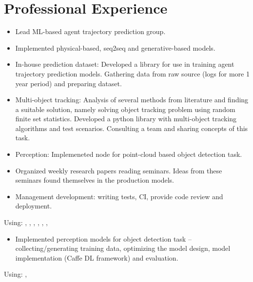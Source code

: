 \section*{\sectionformat Professional Experience}
% 
\begin{itemize}
    \item Lead ML-based agent trajectory prediction group.
    \item Implemented physical-based, seq2seq and generative-based models.
    \item In-house prediction dataset: Developed a library for use in training agent trajectory prediction models. Gathering data from raw source (logs for more 1 year period) and preparing dataset.
    \item Multi-object tracking: Analysis of several methods from literature and finding a suitable solution, namely solving object tracking problem using random finite set statistics. Developed a python library with multi-object tracking algorithms and test scenarios. Consulting a team and sharing concepts of this task.
    \item Perception: Implemeneted node for point-cloud based object detection task.
    \item Organized weekly research papers reading seminars. Ideas from these seminars found themselves in the production models.
    \item Management development: writing tests, CI, provide code review and deployment.
\end{itemize}
Using: , , , , , , 
\horizontalline
% 
\begin{itemize}
    \item Implemented perception models for object detection task -- collecting/generating training data, optimizing the model design, model implementation (Caffe DL framework) and evaluation.
\end{itemize}
Using: , 


